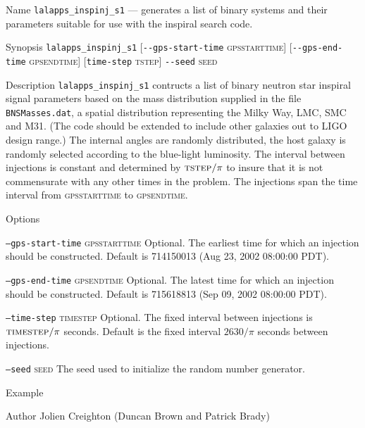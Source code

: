\begin{entry}
\item[Name]
\verb$lalapps_inspinj_s1$ --- generates a list of binary systems and
their parameters suitable for use with the inspiral search code.

\item[Synopsis]
\verb$lalapps_inspinj_s1$ 
[\verb$--gps-start-time$ \textsc{gpsstarttime}] 
[\verb$--gps-end-time$ \textsc{gpsendtime}] 
[\verb$time-step$ \textsc{tstep}] 
\verb$--seed$ \textsc{seed}

\item[Description] 
\verb$lalapps_inspinj_s1$ contructs a list of binary neutron star
inspiral signal parameters based on the mass distribution supplied in
the file \texttt{BNSMasses.dat},  a spatial distribution representing
the Milky Way,  LMC,  SMC and M31.   (The code should be extended to
include other galaxies out to LIGO design range.)   The internal
angles are randomly distributed,  the host galaxy is randomly selected
according to the blue-light luminosity.   The interval between
injections is constant and determined by $\textsc{tstep}/\pi$ to
insure that it is not commensurate with any other times in the
problem.   The injections span the time interval from \textsc{gpsstarttime} 
to \textsc{gpsendtime}.

\item[Options]\leavevmode
\begin{entry}
\item[\texttt{--gps-start-time} \textsc{gpsstarttime}] Optional.  The earliest
time for which an injection should be constructed.   Default is 
714150013 (Aug 23, 2002  08:00:00 PDT).

\item[\texttt{--gps-end-time} \textsc{gpsendtime}] Optional. The latest
time for which an injection should be constructed.  Default is
715618813 (Sep 09, 2002  08:00:00 PDT).

\item[\texttt{--time-step} \textsc{timestep}] Optional. The fixed interval
between injections is $\textsc{timestep}/\pi$ seconds.   Default is the fixed
interval $2630 / \pi$ seconds between injections.

\item[\texttt{--seed} \textsc{seed}] The seed used to initialize the
random number generator.
\end{entry}

\item[Example]

\item[Author] 
Jolien Creighton (Duncan Brown and Patrick Brady)
\end{entry}


